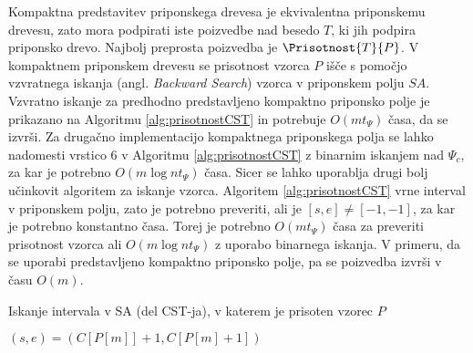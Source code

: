 Kompaktna predstavitev priponskega drevesa je ekvivalentna priponskemu drevesu, zato mora podpirati iste poizvedbe nad besedo $T$, ki jih podpira priponsko drevo. Najbolj preprosta poizvedba je $\Prisotnost{T}{P}$. V kompaktnem priponskem drevesu se prisotnost vzorca $P$ išče s pomočjo vzvratnega iskanja (angl. \textit{Backward Search}) vzorca v priponskem polju $SA$. Vzvratno iskanje za predhodno predstavljeno kompaktno priponsko polje je prikazano na Algoritmu \ref{alg:prisotnostCST} in potrebuje $O(mt_\Psi)$ časa, da se izvrši. Za drugačno implementacijo kompaktnega priponskega polja se lahko nadomesti vrstico 6 v Algoritmu \ref{alg:prisotnostCST} z binarnim iskanjem nad $\Psi_c$, za kar je potrebno $O(m\log{n}t_\Psi)$ časa. Sicer se lahko uporablja drugi bolj učinkovit algoritem za iskanje vzorca. Algoritem \ref{alg:prisotnostCST} vrne interval v priponskem polju, zato je potrebno preveriti, ali je $[s,e]\ne[-1,-1]$, za kar je potrebno konstantno časa. Torej je potrebno $O(mt_\Psi)$ časa za preveriti prisotnost vzorca ali $O(m\log{n}t_\Psi)$ z uporabo binarnega iskanja. V primeru, da se uporabi predstavljeno kompaktno priponsko polje, pa se poizvedba izvrši v času $O(m)$. 

\begin{algorithm}[tb]

\caption{Iskanje intervala v SA (del CST-ja), v katerem je prisoten vzorec $P$ \cite{Navarro2016}}\label{alg:prisotnostCST}    
{
    {$(s,e)=(C[P[m]]+1,C[P[m]+1])$}
    


    {\KwRet{$[s,e]$}}
}

\end{algorithm}

